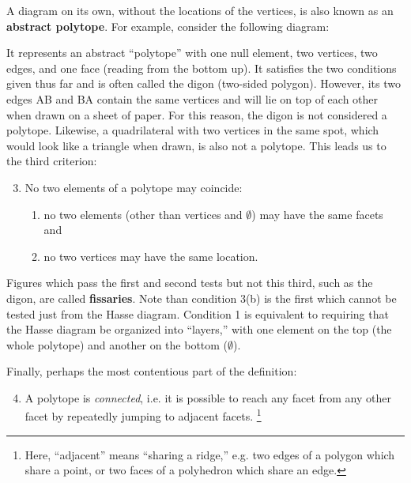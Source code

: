 \documentclass{article}
\begin{document}
A diagram on its own, without the locations of the vertices,
is also known as an \textbf{abstract polytope}.
For example, consider the following diagram:

\begin{center}
\end{center}

It represents an abstract ``polytope'' with
one null element, two vertices, two edges, and one face (reading from the bottom up).
It satisfies the two conditions given thus far and is often called the digon (two-sided polygon).
However, its two edges AB and BA contain the same vertices
and will lie on top of each other when drawn on a sheet of paper.
For this reason, the digon is not considered a polytope.
Likewise, a quadrilateral with two vertices in the same spot,
which would look like a triangle when drawn, is also not a polytope.
This leads us to the third criterion:

\begin{enumerate}
  \setcounter{enumi}{2}
\item No two elements of a polytope may coincide:
  \begin{enumerate}
  \item no two elements (other than vertices and $\emptyset$) may have the same facets and
  \item no two vertices may have the same location.
  \end{enumerate}
\end{enumerate}

Figures which pass the first and second tests but not this third,
such as the digon, are called \textbf{fissaries}.
Note than condition 3(b) is the first which cannot be tested just from the Hasse diagram.
Condition 1 is equivalent to requiring that the Hasse diagram be organized into ``layers,''
with one element on the top (the whole polytope) and another on the bottom ($\emptyset$).

Finally, perhaps the most contentious part of the definition: 

\begin{enumerate}
  \setcounter{enumi}{3}
\item
  A polytope is \textit{connected}, i.e.
  it is possible to reach any facet from any other facet
  by repeatedly jumping to adjacent facets.
  \footnote{
    Here, ``adjacent'' means ``sharing a ridge,''
    e.g. two edges of a polygon which share a point,
    or two faces of a polyhedron which share an edge.
  }
\end{enumerate}
\end{document}
